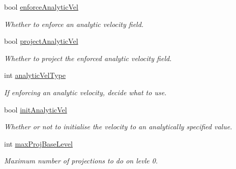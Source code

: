 \begin{DoxyCompactItemize}
\mbox{\label{struct_mushy_layer_options_a3c6edb0bc673aa9b69ae8b2792da2e7f}} 
bool \hyperlink{struct_mushy_layer_options_a3c6edb0bc673aa9b69ae8b2792da2e7f}{enforce\+Analytic\+Vel}
\begin{DoxyCompactList}\small\item\em Whether to enforce an analytic velocity field. \end{DoxyCompactList}\item 
bool \hyperlink{struct_mushy_layer_options_ad55453d9ed5cc38c3bfb6be643d8e240}{project\+Analytic\+Vel}
\begin{DoxyCompactList}\small\item\em Whether to project the enforced analytic velocity field. \end{DoxyCompactList}\item 
\mbox{\label{struct_mushy_layer_options_a44b95443518ac507326c3187d614d065}} 
int \hyperlink{struct_mushy_layer_options_a44b95443518ac507326c3187d614d065}{analytic\+Vel\+Type}
\begin{DoxyCompactList}\small\item\em If enforcing an analytic velocity, decide what to use. \end{DoxyCompactList}\item 
\mbox{\label{struct_mushy_layer_options_adb07b8d4f4f617a2f301246ed820f9b3}} 
bool \hyperlink{struct_mushy_layer_options_adb07b8d4f4f617a2f301246ed820f9b3}{init\+Analytic\+Vel}
\begin{DoxyCompactList}\small\item\em Whether or not to initialise the velocity to an analytically specified value. \end{DoxyCompactList}\item 
\mbox{\label{struct_mushy_layer_options_a5e212b3332da0cb423b87cd829c9b445}} 
int \hyperlink{struct_mushy_layer_options_a5e212b3332da0cb423b87cd829c9b445}{max\+Proj\+Base\+Level}
\begin{DoxyCompactList}\small\item\em Maximum number of projections to do on levle 0. \end{DoxyCompactList}\item 
\mbox{\label{struct_mushy_layer_options_a629685501c6aa2109348a6166b9953ac}} 

\end{DoxyCompactItemize}

